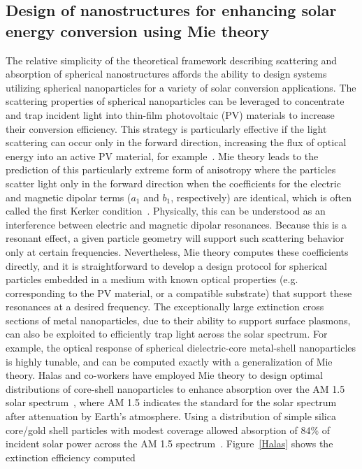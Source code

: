 \documentclass[10pt,letterpaper]{article}
\begin{document}
\subsection{Design of nanostructures for enhancing solar energy conversion using Mie theory}
The relative simplicity of the theoretical framework describing scattering and absorption of spherical 
nanostructures affords the ability to design
systems utilizing spherical nanoparticles for a variety of solar conversion applications.  The scattering properties of
spherical nanoparticles can be leveraged to concentrate and trap incident light into thin-film photovoltaic (PV) materials to increase their
conversion efficiency.  This strategy is particularly effective if the light scattering can occur only in the forward direction, increasing
the flux of optical energy into an active PV material, for example~\cite{AP_NatMat_2010}.
Mie theory
leads to the prediction of this particularly extreme form of anisotropy where the particles scatter light only in the
forward direction when the coefficients for the electric and magnetic dipolar terms ($a_1$ and $b_1$, respectively) 
are identical, which is often called the first Kerker condition~\cite{GGG_NatComm_2012}.
Physically, this can be understood as an interference between electric
and magnetic dipolar resonances.   Because this is a resonant effect, a given particle geometry will support such scattering behavior
only at certain frequencies.  Nevertheless, Mie theory computes these coefficients directly, and it is straightforward to develop a
design protocol for spherical particles embedded in a medium with known optical properties (e.g. corresponding to the PV material, or a
compatible substrate) that support these resonances at a desired frequency.  The exceptionally large extinction cross sections
of metal nanoparticles, due to their ability to support surface plasmons, can also be exploited to efficiently trap light across
the solar spectrum.  For example, the optical response of spherical dielectric-core metal-shell nanoparticles is highly tunable, and can be
computed exactly with a generalization of Mie theory.  Halas and co-workers have employed Mie theory to
design optimal distributions of core-shell nanoparticles to enhance absorption over the AM 1.5 solar 
spectrum~\cite{CH_APL_2006}, where AM 1.5 indicates the standard for the solar 
spectrum after attenuation by Earth's atmosphere.
Using a distribution of simple silica core/gold shell particles with modest coverage allowed absorption of 84\% of incident solar power
across the AM 1.5 spectrum~\cite{CH_APL_2006}.  Figure~\ref{Halas} shows the extinction efficiency computed
\end{document}
